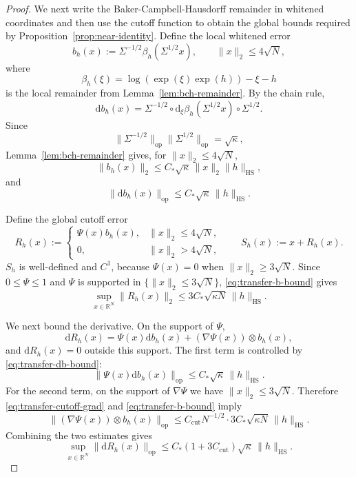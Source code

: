 \documentclass[10pt,a4paper]{amsart}
\newcommand{\HS}{\mathrm{HS}}
\newcommand{\R}{\mathbb{R}}
\newcommand{\dd}{\mathrm{d}}
\newcommand{\op}{\mathrm{op}}
\begin{document}
\begin{proof}
We next write the Baker-Campbell-Hausdorff remainder in whitened coordinates and then use the cutoff function to obtain the global bounds required by Proposition~\ref{prop:near-identity}.
Define the local whitened error
\[
b_h(x):=\Sigma^{-1/2}\beta_h(\Sigma^{1/2}x),
\qquad \|x\|_2\le 4\sqrt N,
\]
where
\[
\beta_h(\xi)=\log(\exp(\xi)\exp(h))-\xi-h
\]
is the local remainder from Lemma~\ref{lem:bch-remainder}. 
By the chain rule,
\[
\dd b_h(x)
=
\Sigma^{-1/2}\circ
\dd_\xi\beta_h(\Sigma^{1/2}x)
\circ \Sigma^{1/2}.
\]
Since
\[
\|\Sigma^{-1/2}\|_{\op}\|\Sigma^{1/2}\|_{\op}
=
\sqrt{\kappa},
\]
Lemma~\ref{lem:bch-remainder} gives, for \(\|x\|_2\le 4\sqrt N\),
\begin{equation}
\label{eq:transfer-b-bound}
\|b_h(x)\|_2
\le
C_\ast\sqrt{\kappa}\,\|x\|_2\|h\|_{\HS},
\end{equation}
and
\begin{equation}
\label{eq:transfer-db-bound}
\|\dd b_h(x)\|_{\op}
\le
C_\ast\sqrt{\kappa}\,\|h\|_{\HS}.
\end{equation}

Define the global cutoff error
\[
R_h(x):=
\begin{cases}
\Psi(x)b_h(x), & \|x\|_2\le 4\sqrt N,\\
0, & \|x\|_2>4\sqrt N,
\end{cases}
\qquad
S_h(x):=x+R_h(x).
\]
$S_{h}$ is well-defined and \(C^1\), because \(\Psi(x)=0\) when
\(\|x\|_2\ge 3\sqrt N\). Since \(0\le \Psi\le 1\) and \(\Psi\) is supported in
\(\{\|x\|_2\le 3\sqrt N\}\), \eqref{eq:transfer-b-bound} gives
\begin{equation}
\label{eq:transfer-R-bound}
\sup_{x\in\R^N}\|R_h(x)\|_2
\le
3C_\ast\sqrt{\kappa N}\,\|h\|_{\HS}.
\end{equation}

We next bound the derivative. On the support of \(\Psi\),
\[
\dd R_h(x)
=
\Psi(x)\dd b_h(x)+(\nabla\Psi(x))\otimes b_h(x),
\]
and \(\dd R_h(x)=0\) outside this support. The first term is controlled by
\eqref{eq:transfer-db-bound}:
\[
\|\Psi(x)\dd b_h(x)\|_{\op}
\le
C_\ast\sqrt{\kappa}\,\|h\|_{\HS}.
\]
For the second term, on the support of \(\nabla\Psi\) we have
\(\|x\|_2\le 3\sqrt N\). Therefore \eqref{eq:transfer-cutoff-grad} and
\eqref{eq:transfer-b-bound} imply
\[
\|(\nabla\Psi(x))\otimes b_h(x)\|_{\op}
\le
C_{\mathrm{cut}}N^{-1/2}
\cdot
3C_\ast\sqrt{\kappa N}\,\|h\|_{\HS}.
\]
Combining the two estimates gives
\begin{equation}
\label{eq:transfer-DR-bound}
\sup_{x\in\R^N}\|\dd R_h(x)\|_{\op}
\le
C_\ast(1+3C_{\mathrm{cut}})\sqrt{\kappa}\,\|h\|_{\HS}.
\end{equation}


\end{proof}
\end{document}
